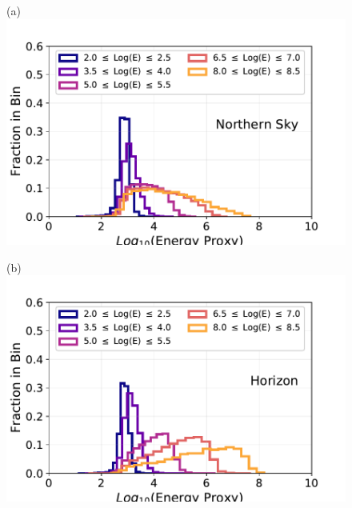 \documentclass[aps,10pt,prd,twocolumn,floats,letterpaper,showpacs,nofootinbib,bibnotes,notitlepage,superscriptaddress,floatfix]{revtex4-1}
\begin{document}
\begin{figure}[t]\centering
\begin{minipage}[c][3.5cm][c]{0.30\textwidth}\centering
{(a)}\\\includegraphics[width=\linewidth]{./PublicReleasePlots/ReconstructionPlots/IC86-II/IC86_II_MC_esmearing_2.pdf}
\end{minipage}
\begin{minipage}[c][3.5cm][c]{0.30\textwidth}\centering
{(b)}\\\includegraphics[width=\linewidth]{./PublicReleasePlots/ReconstructionPlots/IC86-II/IC86_II_MC_esmearing_1.pdf}
\end{minipage}
\begin{minipage}[c][3.5cm][c]{0.30\textwidth}\centering

\end{minipage}
\end{figure}
\end{document}
